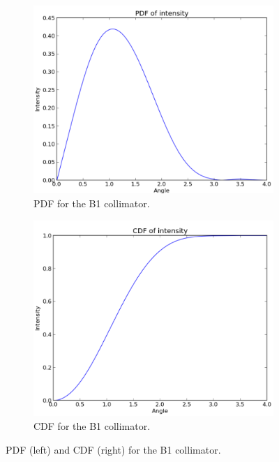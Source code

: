 \begin{figure}
    \centering
    
    \begin{subfigure}{0.5\textwidth}
        \centering
        \includegraphics[width=\textwidth]{Figures/B1_coll_pdf.png} %
        \caption{PDF for the B1 collimator.}
    \end{subfigure}\hfill
    \begin{subfigure}{0.5\textwidth}
        \centering
        \includegraphics[width=\textwidth]{Figures/B1_coll_cdf.png} %
        \caption{CDF for the B1 collimator.}
    \end{subfigure}
    \caption{PDF (left) and CDF (right) for the B1 collimator.}
    \label{fig:PDF_CDF_coll_B1}
\end{figure}

